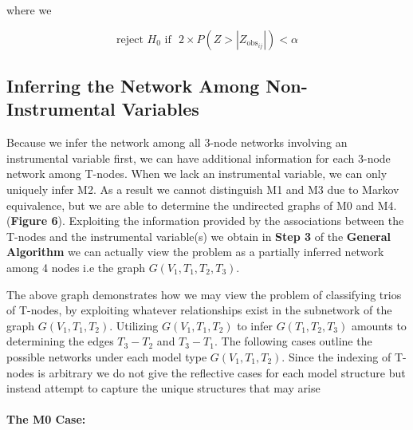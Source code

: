 \documentclass[12pt]{report}
\begin{document}
where we 

\[ \text{reject $H_0$ if} \ \ \ 2\times P(Z >  |Z_{\text{obs}_{ij}}|) < \alpha \]

\subsection*{Inferring the Network Among Non-Instrumental Variables}

Because we infer the network among all 3-node networks involving an instrumental variable first, we can have additional information for each 3-node network among T-nodes. When we lack an instrumental variable, we can only uniquely infer M2. As a result we cannot distinguish M1 and M3 due to Markov equivalence, but we are able to determine the undirected graphs of M0 and M4. (\textbf{Figure 6}). Exploiting the information provided by the associations between the T-nodes and the instrumental variable(s) we obtain in \textbf{Step 3} of the \textbf{General Algorithm} we can actually view the problem as a partially inferred network among 4 nodes i.e the graph $G(V_1, T_1, T_2, T_3)$.\\


\begin{center}
\end{center}
The above graph demonstrates how we may view the problem of classifying trios of T-nodes, by exploiting whatever relationships exist in the subnetwork of the  graph $G(V_1, T_1,T_2)$. Utilizing $G(V_1, T_1,T_2)$ to infer $G(T_1,T_2,T_3)$ amounts to determining the edges $ T_3 - T_2$ and $T_3 - T_1$. The following cases outline the possible networks under each model type $G(V_1, T_1,T_2)$. Since the indexing of T-nodes is arbitrary we do not give the reflective cases for each model structure but instead attempt to capture the unique structures that may arise\\
\\


\textbf{The M0 Case:}
\\

\begin{center}
\end{center}
\end{document}
